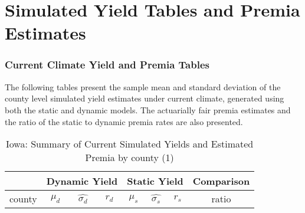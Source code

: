 \section{Simulated Yield Tables and Premia Estimates}

\subsubsection{Current Climate Yield and Premia Tables}

The following tables present the sample mean and standard deviation of the county level simulated yield estimates under current climate, generated using both the static and dynamic models. The actuarially fair premia estimates and the ratio of the static to dynamic premia rates are also presented.

\begin{table}[H]\centering
\caption{Iowa: Summary of Current Simulated Yields and Estimated Premia by county (1)}
\label{my-label}
\begin{tabular}{|c|ccc|ccc|c|}

\hline
\multicolumn{1}{|c}{} & \multicolumn{3}{|c}{Dynamic Yield} & \multicolumn{3}{|c}{Static Yield} & \multicolumn{1}{|c|}{Comparison}\\ 
\hline
county        & $\mu_d$ & $\hat{\sigma_d}$ & $r_d$ & $\mu_s$ & $\hat{\sigma_s}$ & $r_s$ & ratio \\
\hline


\end{tabular}
\end{table}

